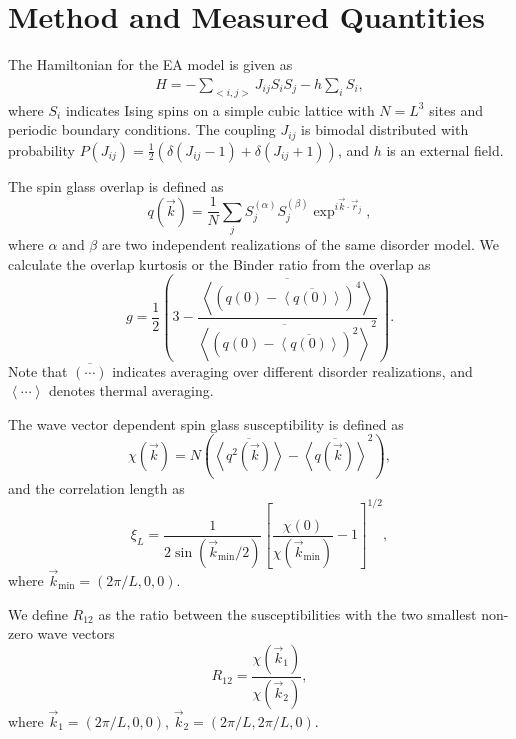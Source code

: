 \section{Method and Measured Quantities} 
The Hamiltonian for the EA model is given as
\begin{eqnarray}
H=-\sum_{<i,j>} J_{ij} S_{i}S_{j}-h\sum_{i}S_{i},
\label{Hamiltonian}
\end{eqnarray}
where $S_i$ indicates Ising spins on a simple cubic lattice with $N=L^3$ sites and periodic boundary conditions. 
The coupling $J_{ij}$ is bimodal distributed with probability %
$P(J_{ij}) = \frac{1}{2}(\delta(J_{ij}-1) + \delta(J_{ij}+1))$, and $h$ is an external field.

The spin glass overlap is defined as 
\begin{equation}
  \label{eq:overlap}
  q(\vec{k})=\frac{1}{N}\sum_{j}S_j^{(\alpha)} S_j^{(\beta)}\exp^{i\vec{k} \cdot \vec{r}_j},
\end{equation}
where $\alpha$ and $\beta$ are two independent realizations of the same disorder model.
We calculate the overlap kurtosis or the Binder ratio from the overlap as \cite{Ciria-etal-1993,Marinari-etal-1998}
\begin{equation}
  \label{eq:binder}
  g=\frac{1}{2}\left(3-\frac{\overline{\left<\left(q(0)-\overline{\left<q(0)\right>}\right)^4\right>}}{\overline{\left<\left(q(0)-\overline{\left<q(0)\right>}\right)^2\right>}^2}\right).
\end{equation}
Note that $\overline{(\cdots)}$ indicates averaging over different disorder realizations,
and $\left<\cdots\right>$ denotes thermal averaging.


The wave vector dependent spin glass susceptibility is defined as \cite{Marinari-etal-1998}
\begin{equation}
  \label{eq:chi}
  \chi(\vec{k})= N(\overline{\left<q^2(\vec{k})\right>}-\overline{\left<q(\vec{k})\right>}^2),
\end{equation}
and the correlation length as 
\begin{equation}
  \label{eq:corr}
  \xi_L=\frac{1}{2\sin(\vec{k}_{\mathrm{min}}/2)}\left[\frac{\chi(0)}{\chi(\vec{k}_{\mathrm{min}})}-1\right]^{1/2},
\end{equation}
where $\vec{k}_{\mathrm{min}}=(2\pi/L,0,0)$. 

We define $R_{12}$ as the ratio between the susceptibilities with the two smallest non-zero wave 
vectors \cite{Banos-2012}
\begin{equation}
  \label{eq:r12}
  R_{12}=\frac{\chi(\vec{k}_1)}{\chi(\vec{k}_2)},
\end{equation}
where $\vec{k}_1=(2\pi/L,0,0)$, $\vec{k}_2=(2\pi/L,2\pi/L,0)$.


